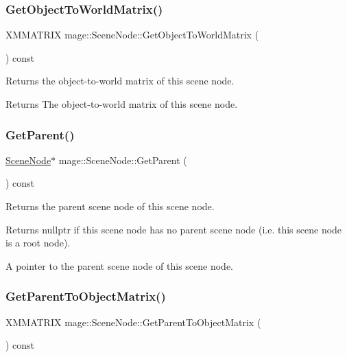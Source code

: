 \subsubsection{\texorpdfstring{Get\+Object\+To\+World\+Matrix()}{GetObjectToWorldMatrix()}}
{\footnotesize\ttfamily X\+M\+M\+A\+T\+R\+IX mage\+::\+Scene\+Node\+::\+Get\+Object\+To\+World\+Matrix (\begin{DoxyParamCaption}{ }\end{DoxyParamCaption}) const}

Returns the object-\/to-\/world matrix of this scene node.

\begin{DoxyReturn}{Returns}
The object-\/to-\/world matrix of this scene node. 
\end{DoxyReturn}
\hypertarget{classmage_1_1_scene_node_a512a9d0f935abf304980312680be3f30}{}\label{classmage_1_1_scene_node_a512a9d0f935abf304980312680be3f30} 
\subsubsection{\texorpdfstring{Get\+Parent()}{GetParent()}}
{\footnotesize\ttfamily \hyperlink{classmage_1_1_scene_node}{Scene\+Node}$\ast$ mage\+::\+Scene\+Node\+::\+Get\+Parent (\begin{DoxyParamCaption}{ }\end{DoxyParamCaption}) const}

Returns the parent scene node of this scene node.

\begin{DoxyReturn}{Returns}
{\ttfamily nullptr} if this scene node has no parent scene node (i.\+e. this scene node is a root node). 

A pointer to the parent scene node of this scene node. 
\end{DoxyReturn}
\hypertarget{classmage_1_1_scene_node_a5ec8b0d2e5ba7873842c0fa65e1248bb}{}\label{classmage_1_1_scene_node_a5ec8b0d2e5ba7873842c0fa65e1248bb} 
\subsubsection{\texorpdfstring{Get\+Parent\+To\+Object\+Matrix()}{GetParentToObjectMatrix()}}
{\footnotesize\ttfamily X\+M\+M\+A\+T\+R\+IX mage\+::\+Scene\+Node\+::\+Get\+Parent\+To\+Object\+Matrix (\begin{DoxyParamCaption}{ }\end{DoxyParamCaption}) const}

